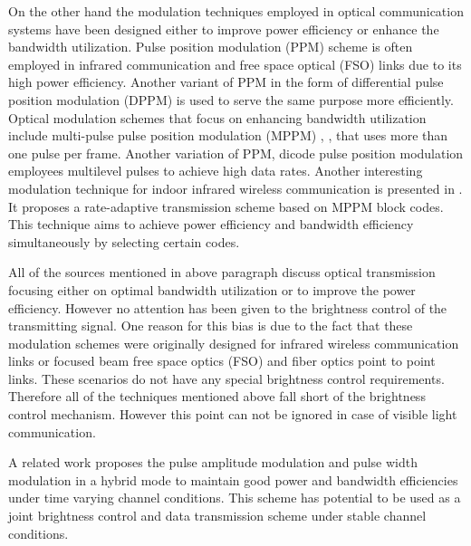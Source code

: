 On the other hand the modulation techniques employed in optical communication systems have been designed either to improve power efficiency or enhance the bandwidth utilization. Pulse position modulation (PPM) scheme is often employed in infrared communication and free space optical (FSO) links \cite{audeh1996performance} \cite{lesh1983capacity} due to its high power efficiency. Another variant of PPM in the form of differential pulse position modulation (DPPM) is used to serve the same purpose \cite{shiu1999differential} more efficiently. Optical modulation schemes that focus on enhancing bandwidth utilization include multi-pulse pulse position modulation (MPPM) \cite{kozawa2008enhancement}, \cite{xu2009coded}, \cite{sugiyama1989mppm} that uses more than one pulse per frame. Another variation of PPM, dicode pulse position modulation \cite{sibley2003dicode} employees multilevel pulses to achieve high data rates. Another interesting modulation technique for indoor infrared wireless communication is presented in \cite{garrido2006variable}. It proposes a rate-adaptive transmission scheme based on MPPM block codes. This technique aims to achieve  power efficiency and bandwidth efficiency simultaneously by selecting certain codes. 

All of the sources mentioned in above paragraph discuss optical transmission focusing either on optimal bandwidth utilization or to improve the power efficiency. However no attention has been given to the brightness control of the transmitting signal. One reason for this bias is due to the fact that these modulation schemes were originally designed for infrared wireless communication links or focused beam free space optics (FSO) and fiber optics point to point links. These scenarios do not have any special brightness control requirements. Therefore all of the techniques mentioned above fall short of the brightness control mechanism. However this point can not be ignored in case of visible light  communication.

A related work \cite{zeng2007tunable} proposes the pulse amplitude modulation and pulse width modulation in a hybrid mode to maintain good power and bandwidth efficiencies under time varying channel conditions. This scheme has potential to be used as a joint brightness control and data transmission scheme under stable channel conditions.

